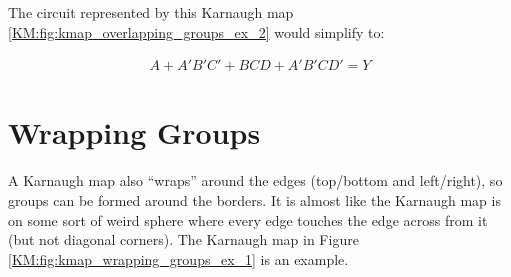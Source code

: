The circuit represented by this Karnaugh map \ref{KM:fig:kmap_overlapping_groups_ex_2} would simplify to:

\begin{align}
  \label{KM:eq:overlapping_groups_ex_2}
  A+A'B'C'+BCD+A'B'CD' = Y
\end{align}

\section{Wrapping Groups}
\label{KM:sec:wrapping_groups}

A Karnaugh map also ``wraps'' around the edges (top/bottom and left/right), so groups can be formed around the borders. It is almost like the Karnaugh map is on some sort of weird sphere where every edge touches the edge across from it (but not diagonal corners). The Karnaugh map in Figure \ref{KM:fig:kmap_wrapping_groups_ex_1} is an example. 

